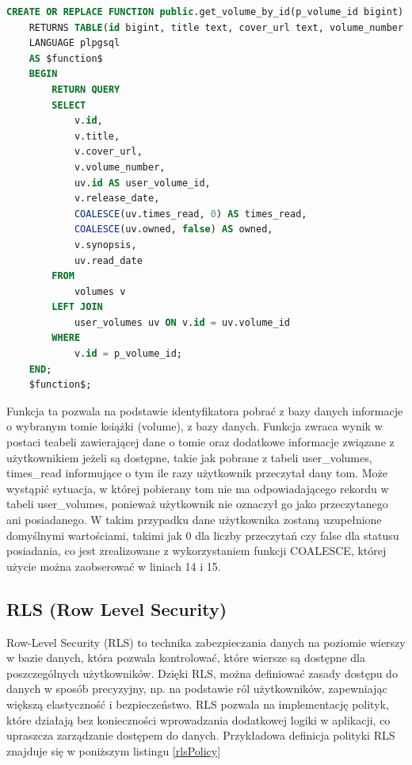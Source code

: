 \documentclass[12pt,twoside]{article}
\begin{document}
\begin{lstlisting}[language=SQL,caption=kod funkcji get\_volume\_by\_id, label={sqlFunction}]
	CREATE OR REPLACE FUNCTION public.get_volume_by_id(p_volume_id bigint)
	RETURNS TABLE(id bigint, title text, cover_url text, volume_number smallint, user_volume_id bigint, release_date timestamp with time zone, times_read smallint, owned boolean, synopsis text, read_date timestamp with time zone)
	LANGUAGE plpgsql
	AS $function$
	BEGIN
		RETURN QUERY
		SELECT 
			v.id,
			v.title,
			v.cover_url,
			v.volume_number,
			uv.id AS user_volume_id,
			v.release_date,
			COALESCE(uv.times_read, 0) AS times_read,
			COALESCE(uv.owned, false) AS owned,
			v.synopsis,
			uv.read_date
		FROM 
			volumes v
		LEFT JOIN 
			user_volumes uv ON v.id = uv.volume_id
		WHERE 
			v.id = p_volume_id;
	END;
	$function$;
\end{lstlisting}
Funkcja ta pozwala na podstawie identyfikatora pobrać z bazy danych informacje o wybranym tomie książki (volume), z bazy
danych. Funkcja zwraca wynik w postaci teabeli zawierającej dane o tomie oraz dodatkowe informacje związane z użytkownikiem
jeżeli są dostępne, takie jak pobrane z tabeli user\_volumes, times\_read informujące o tym ile razy użytkownik przeczytał
dany tom. Może wystąpić sytuacja, w której pobierany tom nie ma odpowiadającego rekordu w tabeli user\_volumes, ponieważ 
użytkownik nie oznaczył go jako przeczytanego ani posiadanego. W takim przypadku dane użytkownika zostaną uzupełnione 
domyślnymi wartościami, takimi jak 0 dla liczby przeczytań czy false dla statusu posiadania, co jest zrealizowane z 
wykorzystaniem funkcji COALESCE, której użycie można zaobserować w liniach 14 i 15.

\subsection{RLS (Row Level Security)}

Row-Level Security (RLS) to technika zabezpieczania danych na poziomie wierszy w bazie danych, która pozwala 
kontrolować, które wiersze są dostępne dla poszczególnych użytkowników. Dzięki RLS, można definiować zasady 
dostępu do danych w sposób precyzyjny, np. na podstawie ról użytkowników, zapewniając większą elastyczność i 
bezpieczeństwo. RLS pozwala na implementację polityk, które działają bez konieczności wprowadzania dodatkowej 
logiki w aplikacji, co upraszcza zarządzanie dostępem do danych. Przykładowa definicja polityki RLS znajduje się
w poniższym listingu \ref{rlsPolicy}
\end{document}
